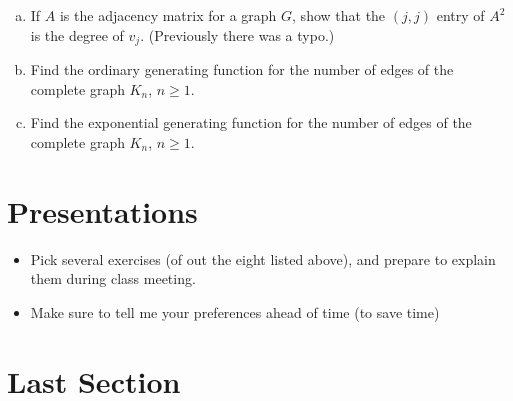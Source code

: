 \documentclass[10pt]{amsart}
\begin{document}
\begin{enumerate}[a.)]
\begin{center}
\end{center}



\item 
If $A$ is the adjacency matrix for a graph $G$, show that the $(j,j)$ entry of $A^2$ is the degree of $v_j$. (Previously there was a typo.)
\\

\item 
Find the ordinary generating function for the number of edges of the complete graph $K_n$, $n\geq 1$.

\item Find the exponential generating function for the number of edges of the complete graph $K_n$, $n\geq 1$.


\end{enumerate}








\section{Presentations}
\begin{itemize}
	\item Pick several exercises (of out the eight listed above), and prepare to explain them during class meeting.
	\item Make sure to tell me your preferences ahead of time (to save time)
\end{itemize}





\section{Last Section}
\end{document}

